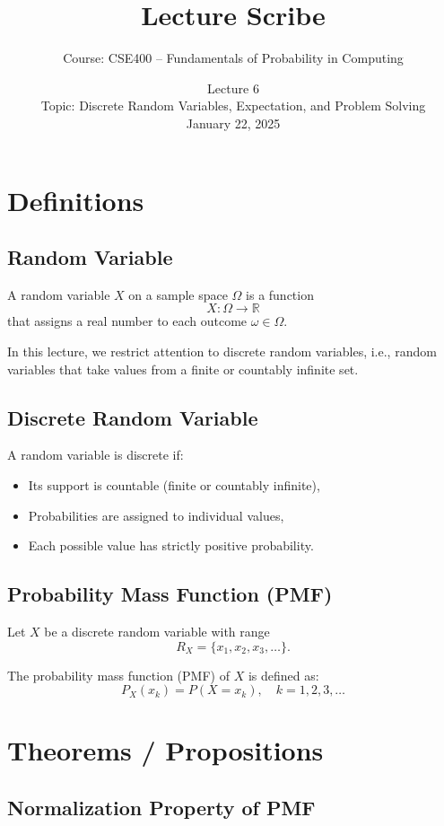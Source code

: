 \documentclass[12pt]{article}
\title{Lecture Scribe}
\author{Course: CSE400 -- Fundamentals of Probability in Computing}
\date{Lecture 6 \\ Topic: Discrete Random Variables, Expectation, and Problem Solving \\ January 22, 2025}
\begin{document}
\maketitle

\section*{Definitions}

\subsection*{Random Variable}

A random variable $X$ on a sample space $\Omega$ is a function
\[
X : \Omega \rightarrow \mathbb{R}
\]
that assigns a real number to each outcome $\omega \in \Omega$.

In this lecture, we restrict attention to discrete random variables, i.e., random variables that take values from a finite or countably infinite set.

\subsection*{Discrete Random Variable}

A random variable is discrete if:
\begin{itemize}
    \item Its support is countable (finite or countably infinite),
    \item Probabilities are assigned to individual values,
    \item Each possible value has strictly positive probability.
\end{itemize}

\subsection*{Probability Mass Function (PMF)}

Let $X$ be a discrete random variable with range
\[
R_X = \{x_1, x_2, x_3, \dots\}.
\]

The probability mass function (PMF) of $X$ is defined as:
\[
P_X(x_k) = P(X = x_k), \quad k = 1,2,3,\dots
\]

\section*{Theorems / Propositions}

\subsection*{Normalization Property of PMF}
\end{document}
